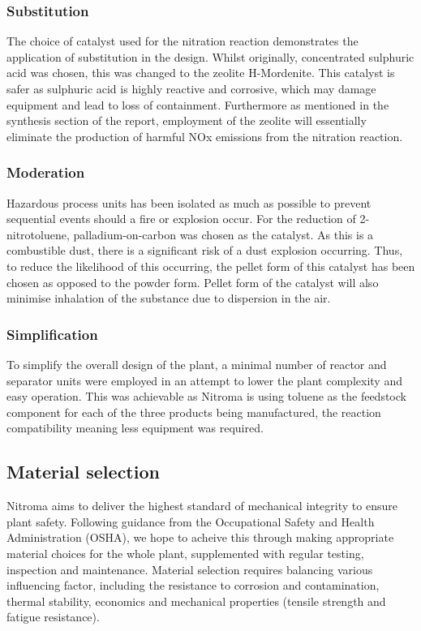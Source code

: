 \subsubsection{Substitution} 
The choice of catalyst used for the nitration reaction demonstrates the application of substitution in the design. Whilst originally, concentrated sulphuric acid was chosen, this was changed to the zeolite H-Mordenite. This catalyst is safer as sulphuric acid is highly reactive and corrosive, which may damage equipment and lead to loss of containment. Furthermore as mentioned in the synthesis section of the report, employment of the zeolite will essentially eliminate the production of harmful NOx emissions from the nitration reaction. 

\subsubsection{Moderation} 
Hazardous process units has been isolated as much as possible to prevent sequential events should a fire or explosion occur. For the reduction of 2-nitrotoluene,  palladium-on-carbon was chosen as the catalyst. As this is a combustible dust, there is a significant risk of a dust explosion occurring. Thus, to reduce the likelihood of this occurring, the pellet form of this catalyst has been chosen as opposed to the powder form. Pellet form of the catalyst will also minimise inhalation of the substance due to dispersion in the air. 

\subsubsection{Simplification} 
To simplify the overall design of the plant, a minimal number of reactor and separator units were employed in an attempt to lower the plant complexity and easy operation. This was achievable as Nitroma is using toluene as the feedstock component for each of the three products being manufactured, the reaction compatibility meaning less equipment was required. 

\subsection{Material selection}

Nitroma aims to deliver the highest standard of mechanical integrity to ensure plant safety.  Following guidance from the Occupational Safety and Health Administration (OSHA), we hope to acheive this through making appropriate material choices for the whole plant, supplemented with regular testing, inspection and maintenance. Material selection requires balancing various influencing factor, including the resistance to corrosion and contamination, thermal stability, economics and mechanical properties (tensile strength and fatigue resistance). 


